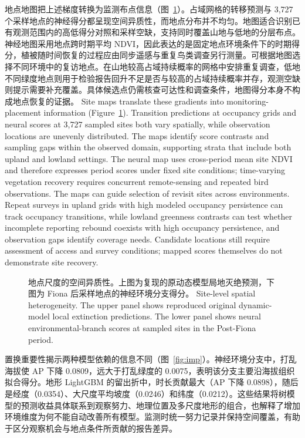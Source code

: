 \ifzh
地点地图把上述梯度转换为监测布点信息（图~\ref{fig:surf}）。占域网格的转移预测与 3,727 个采样地点的神经得分都呈现空间异质性，而地点分布并不均匀。地图适合识别已有观测范围内的高低得分对照和采样空缺，支持同时覆盖山地与低地的分层布点。神经地图采用地点跨时期平均 NDVI，因此表达的是固定地点环境条件下的时期得分，植被随时间恢复的过程应由同步遥感与重复鸟类调查另行测量。可根据地图选择不同环境中的复访地点。在山地较高占域持续概率的网格中安排重复调查，低地不同绿度地点则用于检验报告回升不足是否与较高的占域持续概率并存，观测空缺则提示需要补充覆盖。具体候选点仍需核查可达性和调查条件，地图得分本身不构成地点恢复的证据。
\else
Site maps translate these gradients into monitoring-placement information (Figure~\ref{fig:surf}). Transition predictions at occupancy grids and neural scores at 3,727 sampled sites both vary spatially, while observation locations are unevenly distributed. The maps identify score contrasts and sampling gaps within the observed domain, supporting strata that include both upland and lowland settings. The neural map uses cross-period mean site NDVI and therefore expresses period scores under fixed site conditions; time-varying vegetation recovery requires concurrent remote-sensing and repeated bird observations. The maps can guide selection of revisit sites across environments. Repeat surveys in upland grids with high modeled occupancy persistence can track occupancy transitions, while lowland greenness contrasts can test whether incomplete reporting rebound coexists with high occupancy persistence, and observation gaps identify coverage needs. Candidate locations still require assessment of access and survey conditions; mapped scores themselves do not demonstrate site recovery.
\fi
\begin{figure}[htbp]\centering{}
\caption{\ifzh
地点尺度的空间异质性。上图为复现的原动态模型局地灭绝预测，下图为 Fiona 后采样地点的神经环境分支得分。
\else
Site-level spatial heterogeneity. The upper panel shows reproduced original dynamic-model local extinction predictions. The lower panel shows neural environmental-branch scores at sampled sites in the Post-Fiona period.
\fi}\label{fig:surf}
\end{figure}
\ifzh
置换重要性揭示两种模型依赖的信息不同（图~\ref{fig:imp}）。神经环境分支中，打乱海拔使 AP 下降 0.0809，远大于打乱绿度的 0.0075，表明该分支主要沿海拔组织拟合得分。地形 LightGBM 的留出折中，时长贡献最大（AP 下降 0.0898），随后是经度（0.0354）、大尺度平均坡度（0.0246）和纬度（0.0212）。这些结果将树模型的预测收益具体联系到观察努力、地理位置及多尺度地形的组合，也解释了增加环境维度为何不能自动改善所有模型。监测时统一努力记录并保持空间覆盖，有助于区分观察机会与地点条件所贡献的报告差异。
